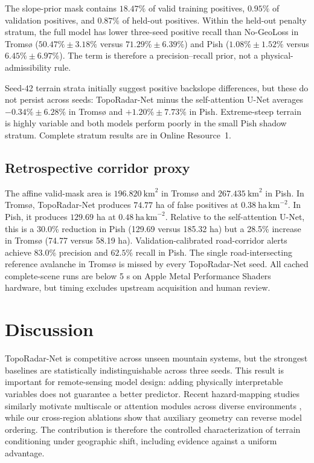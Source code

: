 \documentclass[referee,lineno,pdflatex,sn-apa]{sn-jnl}
\begin{document}
The slope-prior mask contains $18.47\%$ of valid training positives, $0.95\%$ of validation positives, and $0.87\%$ of held-out positives. Within the held-out penalty stratum, the full model has lower three-seed positive recall than No-GeoLoss in Troms{\o} ($50.47\%\pm3.18\%$ versus $71.29\%\pm6.39\%$) and Pish ($1.08\%\pm1.52\%$ versus $6.45\%\pm6.97\%$). The term is therefore a precision--recall prior, not a physical-admissibility rule.

Seed-42 terrain strata initially suggest positive backslope differences, but these do not persist across seeds: TopoRadar-Net minus the self-attention U-Net averages $-0.34\%\pm6.28\%$ in Troms{\o} and $+1.20\%\pm7.73\%$ in Pish. Extreme-steep terrain is highly variable and both models perform poorly in the small Pish shadow stratum. Complete stratum results are in Online Resource~1.

\subsection{Retrospective corridor proxy}

The affine valid-mask area is $196.820~\mathrm{km}^{2}$ in Troms{\o} and $267.435~\mathrm{km}^{2}$ in Pish. In Troms{\o}, TopoRadar-Net produces $74.77$ ha of false positives at $0.38~\mathrm{ha\,km}^{-2}$. In Pish, it produces $129.69$ ha at $0.48~\mathrm{ha\,km}^{-2}$. Relative to the self-attention U-Net, this is a 30.0\% reduction in Pish (129.69 versus 185.32 ha) but a 28.5\% increase in Troms{\o} (74.77 versus 58.19 ha). Validation-calibrated road-corridor alerts achieve $83.0\%$ precision and $62.5\%$ recall in Pish. The single road-intersecting reference avalanche in Troms{\o} is missed by every TopoRadar-Net seed. All cached complete-scene runs are below 5 s on Apple Metal Performance Shaders hardware, but timing excludes upstream acquisition and human review.

\section{Discussion}

TopoRadar-Net is competitive across unseen mountain systems, but the strongest baselines are statistically indistinguishable across three seeds. This result is important for remote-sensing model design: adding physically interpretable variables does not guarantee a better predictor. Recent hazard-mapping studies similarly motivate multiscale or attention modules across diverse environments \citep{nguyen2025landslide,chandra2025landslide}, while our cross-region ablations show that auxiliary geometry can reverse model ordering. The contribution is therefore the controlled characterization of terrain conditioning under geographic shift, including evidence against a uniform advantage.
\end{document}
